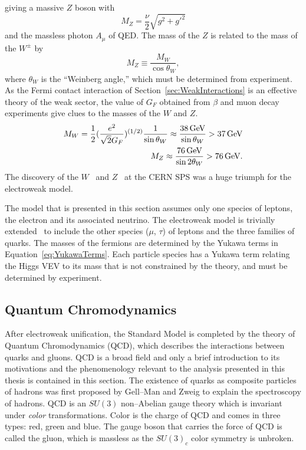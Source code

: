 giving a massive $Z$ boson with 
\begin{equation}
  M_Z = \frac{\nu}{2}\sqrt{g^2 + g'^2} 
  \label{eq:ZBosonMass}
\end{equation}
and the massless photon $A_\mu$ of QED\@.  The mass of the $Z$ is related to the
mass of the $W^\pm$ by 
\begin{equation}
  M_Z \equiv \frac{M_W}{\cos \theta_W},
\end{equation}
where $\theta_W$ is the ``Weinberg angle,'' which must be determined from
experiment.  As the Fermi contact interaction of
Section~\ref{sec:WeakInteractions} is an effective theory of the weak sector,
the value of $G_F$ obtained from $\beta$ and muon decay experiments give clues
to the masses of the $W$ and $Z$.  
\begin{eqnarray}
  M_W = \frac{1}{2}(\frac{e^2}{\sqrt 2 G_F})^{(1/2)}\frac{1}{\sin\theta_W} \approx
  \frac{38 \,\text{Ge\hspace{-.08em}V}}{\sin\theta_W} > 37 \,\text{Ge\hspace{-.08em}V} \\ 
  M_Z \approx \frac{76 \,\text{Ge\hspace{-.08em}V}}{\sin
  2\theta_W} > 76\,\text{Ge\hspace{-.08em}V}.
\end{eqnarray}
The discovery of the $W$~\cite{UA1WDiscovery,UA2WDiscovery} and
$Z$~\cite{UA1ZDiscovery, UA2ZDiscovery} at the CERN SPS was a huge triumph for
the electroweak model.

The model that is presented in this section assumes only one species of leptons,
the electron and its associated neutrino.  The electroweak model is trivially
extended~\cite{Morii:SMandBSM} to include the other species ($\mu$, $\tau$) of
leptons and the three families of quarks. The masses of the fermions are
determined by the Yukawa terms in Equation~\ref{eq:YukawaTerms}.  Each particle
species has a Yukawa term relating the Higgs VEV to its mass that is not
constrained by the theory, and must be determined by experiment.

\subsection{Quantum Chromodynamics}

After electroweak unification, the Standard Model is completed by the theory of
Quantum Chromodynamics (QCD), which describes the interactions between quarks
and gluons.  QCD is a broad field and only a brief introduction to its
motivations and the phenomenology relevant to the analysis presented in this
thesis is contained in this section.  The existence of quarks as composite
particles of hadrons was first proposed by Gell--Man and Zweig to explain the
spectroscopy of hadrons.  QCD is an $SU(3)$ non--Abelian gauge theory which is
invariant under \emph{color} transformations.  Color is the charge of QCD and
comes in three types: red, green and blue.  The gauge boson that carries the
force of QCD is called the gluon, which is massless as the $SU(3)_c$ color
symmetry is unbroken.

